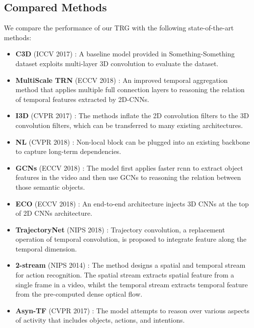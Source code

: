 \documentclass[conference,compsoc]{IEEEtran}
\begin{document}
\subsection{Compared Methods}
    We compare the performance of our TRG with the following state-of-the-art methods:
    \begin{itemize}
        \item \textbf{C3D} (ICCV 2017) \cite{goyal2017something}: A baseline model provided in Something-Something dataset exploits multi-layer 3D convolution \cite{tran2015learning} to evaluate the dataset.
        \item \textbf{MultiScale TRN} (ECCV 2018) \cite{zhou2018temporal}: An improved temporal aggregation method that applies multiple full connection layers to reasoning the relation of temporal features extracted by 2D-CNNs.
        \item \textbf{I3D} (CVPR 2017) \cite{carreira2017quo}: The methods inflate the 2D convolution filters to the 3D convolution filters, which can be transferred to many existing architectures.
        \item \textbf{NL} (CVPR 2018) \cite{wang2018non}: Non-local block can be plugged into an existing backbone to capture long-term dependencies. 
        \item \textbf{GCNs} (ECCV 2018) \cite{wang2018videos}: The model first applies faster rcnn to extract object features in the video and then use GCNs to reasoning the relation between those semantic objects.
        \item \textbf{ECO} (ECCV 2018) \cite{zolfaghari2018eco:}: An end-to-end architecture injects 3D CNNs at the top of 2D CNNs architecture.
        \item \textbf{TrajectoryNet} (NIPS 2018) \cite{zhao2018trajectory}:  Trajectory convolution, a replacement operation of temporal convolution, is proposed to integrate feature along the temporal dimension.
        \item \textbf{2-stream} (NIPS 2014) \cite{simonyan2014two}: The method designs a spatial and temporal stream for action recognition. The spatial stream extracts spatial feature from a single frame in a video, whilst the temporal stream extracts temporal feature from the pre-computed dense optical flow.
        \item \textbf{Asyn-TF} (CVPR 2017) \cite{sigurdsson2017asynchronous}: The model attempts to reason over various aspects of activity that includes objects, actions, and intentions.
    \end{itemize}
    
\end{document}
